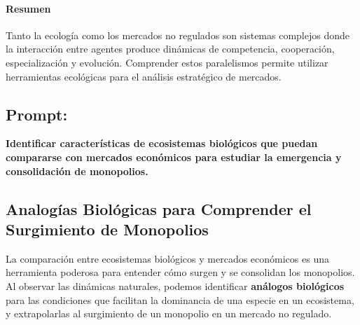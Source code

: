 \documentclass[a4paper,12pt]{article}
\begin{document}
\paragraph{Resumen} Tanto la ecología como los mercados no regulados son sistemas complejos donde la interacción entre agentes produce dinámicas de competencia, cooperación, especialización y evolución. Comprender estos paralelismos permite utilizar herramientas ecológicas para el análisis estratégico de mercados.


\subsection*{Prompt:}
\textbf{Identificar características de ecosistemas biológicos que puedan compararse con mercados económicos para estudiar la emergencia y consolidación de monopolios.}

\subsection*{Analogías Biológicas para Comprender el Surgimiento de Monopolios}

La comparación entre ecosistemas biológicos y mercados económicos es una herramienta poderosa para entender cómo surgen y se consolidan los monopolios. Al observar las dinámicas naturales, podemos identificar \textbf{análogos biológicos} para las condiciones que facilitan la dominancia de una especie en un ecosistema, y extrapolarlas al surgimiento de un monopolio en un mercado no regulado.
\end{document}
